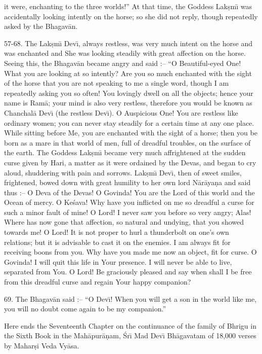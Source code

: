 it were, enchanting to the three worlds!'' At that time, the Goddess Lak\d{s}m\={\i} was accidentally looking intently on the horse; so she did not reply, though repeatedly asked by the Bhagav\=an.

57-68. The Lak\d{s}m\={\i} Dev\={\i}, always restless, was very much intent on the horse and was enchanted and She was looking steadily with great affection on the horse. Seeing this, the Bhagav\=an became angry and said :-- ``O Beautiful-eyed One! What you are looking at so intently? Are you so much enchanted with the sight of the horse that you are not speaking to me a single word, though I am repeatedly asking you so often! You lovingly dwell on all the objects; hence your name is Ram\=a; your mind is also very restless, therefore you would be known as Chanchal\=a Dev\={\i} (the restless Dev\={\i}). O Auspicious One! You are restless like ordinary women; you can never stay steadily for a certain time at any one place. While sitting before Me, you are enchanted with the sight of a horse; then you be born as a mare in that world of men, full of dreadful troubles, on the surface of the earth. The Goddess Lak\d{s}m\={\i} became very much affrightened at the sudden curse given by Hari, a matter as it were ordained by the Devas, and began to cry aloud, shuddering with pain and sorrows. Lak\d{s}m\={\i} Dev\={\i}, then of sweet smiles, frightened, bowed down with great humility to her own lord N\=ar\=aya\d{n}a and said thus :-- O Deva of the Devas! O Govinda! You are the Lord of this world and the Ocean of mercy. O Ke\'sava! Why have you inflicted on me so dreadful a curse for such a minor fault of mine! O Lord! I never saw you before so very angry; Alas! Where has now gone that affection, so natural and undying, that you showed towards me! O Lord! It is not proper to hurl a thunderbolt on one's own relations; but it is advisable to cast it on the enemies. I am always fit for receiving boons from you. Why have you made me now an object, fit for curse. O Govinda! I will quit this life in Your presence. I will never be able to live, separated from You. O Lord! Be graciously pleased and say when shall I be free from this dreadful curse and regain Your happy companion?

69. The Bhagav\=an said :-- ``O Dev\={\i}! When you will get a son in the world like me, you will no doubt come again to be my companion.''

Here ends the Seventeenth Chapter on the continuance of the family of Bhrigu in the Sixth Book in the Mah\=apur\=a\d{n}am, \'Sr\={\i} Mad Dev\={\i} Bh\=agavatam of 18,000 verses by Mahar\d{s}i Veda Vy\=asa.




